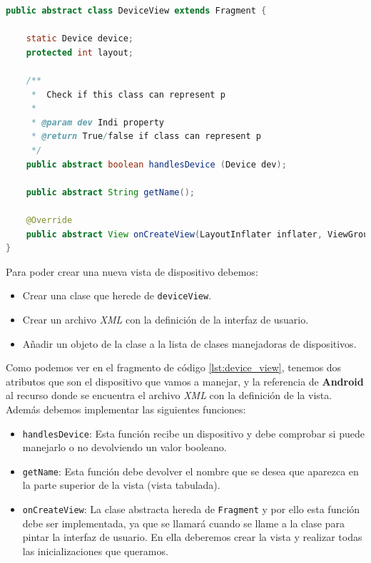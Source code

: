 \begin{lstlisting}[language=Java,caption={Clase abstracta DeviceView},label={lst:device_view}]
public abstract class DeviceView extends Fragment {

    static Device device;
    protected int layout;

    /**
     *  Check if this class can represent p
     *
     * @param dev Indi property
     * @return True/false if class can represent p
     */
    public abstract boolean handlesDevice (Device dev);

    public abstract String getName();

    @Override
    public abstract View onCreateView(LayoutInflater inflater, ViewGroup container, Bundle savedInstanceState);
}

\end{lstlisting}


\bigskip
Para poder crear una nueva vista de dispositivo debemos:

\begin{itemize}
  \item Crear una clase que herede de \texttt{deviceView}.
  \item Crear un archivo \textit{XML} con la definición de la interfaz de usuario.
  \item Añadir un objeto de la clase a la lista de clases manejadoras de dispositivos.
\end{itemize}


Como podemos ver en el fragmento de código \ref{lst:device_view}, tenemos dos atributos que son el dispositivo que vamos a manejar, y la referencia de \textbf{Android} al recurso donde se encuentra el archivo \textit{XML} con la definición de la vista. Además debemos implementar las siguientes funciones:


\begin{itemize}
  \item \texttt{handlesDevice}:
  Esta función recibe un dispositivo y debe comprobar si puede manejarlo o no devolviendo un valor booleano.

  \item \texttt{getName}:
  Esta función debe devolver el nombre que se desea que aparezca en la parte superior de la vista (vista tabulada).

  \item \texttt{onCreateView}:
  La clase abstracta hereda de \texttt{Fragment} y por ello esta función debe ser implementada, ya que se llamará cuando se llame a la clase para pintar la interfaz de usuario\cite{ALCA}. En ella deberemos crear la vista y realizar todas las inicializaciones que queramos.

\end{itemize}

